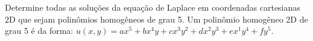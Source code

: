 \linespread{1.5}

Determine todas as soluções da equação de Laplace em coordenadas cartesianas 2D que sejam polinômios homogêneos de grau 5. Um polinômio homogêneo 2D de grau 5 é da forma: $u(x,y) = ax^5 + bx^4y + cx^3y^2 + dx^2y^3 + ex^1y^4 + fy^5$.